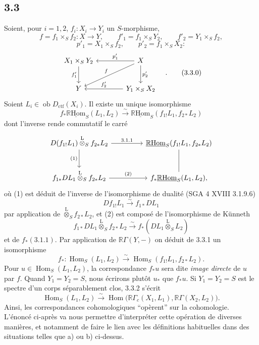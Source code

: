 \documentclass[11pt]{article}
\DeclareMathOperator{\Hom}{Hom}
\newcommand{\R}{\mathbb{R}}\newcommand{\RHomCore}{\mathbb{R}\mathrm{Hom}}
\newcommand{\ob}{\operatorname{ob}}
\providecommand{\RHom}{\RHomCore}
\providecommand{\uRHom}{\underline{\RHom}}
\providecommand{\Dctf}{D_{\mathrm{ctf}}}
\providecommand{\Dctf}{D_{\mathrm{ctf}}}
\providecommand{\RHom}{\RHomCore}
\providecommand{\Hom}{\operatorname{Hom}}
\providecommand{\ob}{\operatorname{ob}}
\providecommand{\RHom}{\R\mathcal{H}om}
\providecommand{\R}{\mathrm R}
\providecommand{\RHom}{\RHomCore}
\providecommand{\Hom}{\operatorname{Hom}}
\begin{document}
\subsection*{3.3}
Soient, pour $i=1,2$, $f_i:X_i\to Y_i$ un $S$-morphisme,
\[
f=f_1\times_S f_2:X\to Y,
\qquad
f'_1=f_1\times_S Y_2,
\qquad
f'_2=Y_1\times_S f_2,
\]
\[
p'_1=X_1\times_S f_2,
\qquad
p'_2=f_1\times_S X_2:
\]
\begin{equation}
\begin{tikzcd}[column sep=3.8em,row sep=2.4em]
X_1\times_S Y_2 \arrow[d,"f'_1"'] & X \arrow[l,"p'_1"'] \arrow[dl,"f"'] \arrow[d,"p'_2"] \\
Y & Y_1\times_S X_2 \arrow[l,"f'_2"']
\end{tikzcd}\quad .
\tag{3.3.0}
\end{equation}
Soient $L_i\in\ob\Dctf(X_i)$. Il existe un unique isomorphisme
\begin{equation}
f_*\uRHom_S(L_1,L_2)
\xrightarrow{\sim}
\uRHom_S(f_{1!}L_1,f_{2*}L_2)
\tag{3.3.1}
\end{equation}
dont l'inverse rende commutatif le carré
\[
\begin{tikzcd}[column sep=4.5em,row sep=2.6em]
D(f_{1!}L_1)\overset{\mathrm{L}}{\otimes}_S f_{2*}L_2
  \arrow[r,"3.1.1"] \arrow[d,"(1)"']
& \uRHom_S(f_{1!}L_1,f_{2*}L_2) \arrow[d,dash] \\
f_{1*}DL_1\overset{\mathrm{L}}{\otimes}_S f_{2*}L_2
  \arrow[r,"(2)"]
& f_*\uRHom_S(L_1,L_2),
\end{tikzcd}
\]
où (1) est
déduit de l'inverse de l'isomorphisme de dualité (SGA 4 XVIII 3.1.9.6)
\[
Df_{1!}L_1\xrightarrow{\sim}f_{1*}DL_1
\]
par application de $\overset{\mathrm{L}}{\otimes}_S f_{2*}L_2$, et (2) est composé de l'isomorphisme de Künneth
\[
f_{1*}DL_1\overset{\mathrm{L}}{\otimes}_S f_{2*}L_2
\xrightarrow{\sim}
f_*(DL_1\overset{\mathrm{L}}{\otimes}_S L_2)
\]
et de $f_*(3.1.1)$. Par application de $\R\Gamma(Y,-)$ on déduit de 3.3.1 un isomorphisme
\begin{equation}
f_*:\Hom_S(L_1,L_2)
\xrightarrow{\sim}
\Hom_S(f_{1!}L_1,f_{2*}L_2).
\tag{3.3.2}
\end{equation}
Pour $u\in\Hom_S(L_1,L_2)$, la correspondance $f_*u$ sera dite \emph{image directe} de $u$ par $f$. Quand $Y_1=Y_2=S$, nous écrirons plutôt $u_*$ que $f_*u$. Si $Y_1=Y_2=S$ est le spectre d'un corps séparablement clos, 3.3.2 s'écrit
\begin{equation}
\Hom_S(L_1,L_2)
\xrightarrow{\sim}
\Hom\bigl(\R\Gamma_c(X_1,L_1),\R\Gamma(X_2,L_2)\bigr).
\tag{3.3.3}
\end{equation}
Ainsi, les correspondances cohomologiques ``opèrent'' sur la cohomologie. L'énoncé ci-après va nous permettre d'interpréter cette opération de diverses manières, et notamment de faire le lien avec les définitions habituelles dans des situations telles que a) ou b) ci-dessus.
\end{document}
